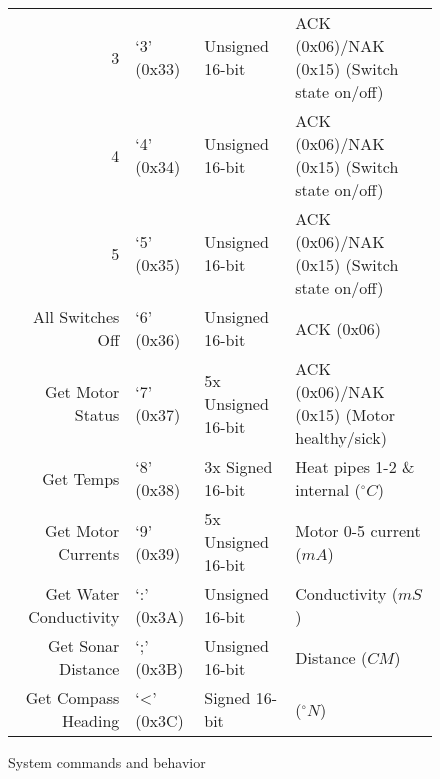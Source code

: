 \documentclass{article}
\begin{document}
\begin{figure}[!h]
\begin{center}
\begin{tabular}{r|l|ll}
3 & `3' (0x33) & Unsigned 16-bit & ACK (0x06)/NAK (0x15) (Switch state on/off) \\
4 & `4' (0x34) & Unsigned 16-bit & ACK (0x06)/NAK (0x15) (Switch state on/off) \\
5 & `5' (0x35) & Unsigned 16-bit & ACK (0x06)/NAK (0x15) (Switch state on/off) \\
\hline
All Switches Off & `6' (0x36) & Unsigned 16-bit & ACK (0x06) \\
\hline
Get Motor Status & `7' (0x37) & 5x Unsigned 16-bit & ACK (0x06)/NAK (0x15) (Motor healthy/sick) \\
Get Temps & `8' (0x38) & 3x Signed 16-bit & Heat pipes 1-2 \& internal ($^\circ C$) \\
Get Motor Currents & `9' (0x39) & 5x Unsigned 16-bit & Motor 0-5 current ($mA$) \\
\hline
Get Water Conductivity & `:' (0x3A) & Unsigned 16-bit & Conductivity ($mS$) \\
Get Sonar Distance & `;' (0x3B) & Unsigned 16-bit & Distance ($CM$) \\
Get Compass Heading & `\textless' (0x3C) & Signed 16-bit & ($^\circ N$) \\

\end{tabular}
\caption{System commands and behavior}
\label{fig:commandlisting}
\end{center}
\end{figure}
\end{document}
